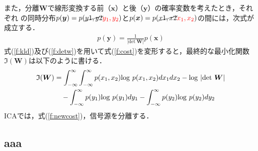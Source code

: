 また，分離$\bm{W}$で線形変換する前（$\bm{x}$）と後（$\bm{y}$）の確率変数を考えたとき，それぞれ
の同時分布$p(\bm{y}) = p(\cancel{y1,y2} \textcolor{red}{y_1,y_2}) $と$p(\bm{x}) = p(\cancel{x1,x2} \textcolor{red}{x_1,x_2})$の間には，次式が成立する．
\begin{align}
    p(\bm{y}) = \frac{1}{|\mathrm{det}~\bm{W}|}p(\bm{x}) \label{f:detw}
\end{align}
式(\ref{f:kld})及び(\ref{f:detw})を用いて式(\ref{f:cost})を変形すると，最終的な最小化関数$\mathfrak{I}(\bm{W})$は以下のように書ける．
\begin{align}
\begin{split}
  \mathfrak{I}(\bm{W}) &= \int_{-\infty}^{\infty} \int_{-\infty}^{\infty} p(x_1,x_2){\rm log}~p(x_1,x_2)dx_1 dx_2 - {\rm log}~|\mathrm{det}~\bm{W}|\\
  &\quad -\int_{-\infty}^{\infty} p(y_1){\rm log}~p(y_1)dy_1 - \int_{-\infty}^{\infty} p(y_2){\rm log}~p(y_2)dy_2    \label{f:newcost}
\end{split}
\end{align}
ICAでは，式(\ref{f:newcost})，信号源を分離する．


\subsection{aaa}

